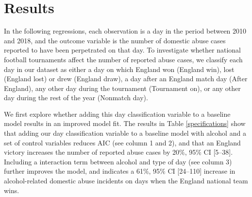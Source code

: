 \documentclass[12pt, letterpaper]{article}
\begin{document}
\clearpage


\section{Results}

In the following regressions, each observation is a day in the period between 2010 and 2018, and the outcome variable is the number of domestic abuse cases reported to have been perpetrated on that day. To investigate whether national football tournaments affect the number of reported abuse cases, we classify each day in our dataset as either a day on which England won (England win), lost (England lost) or drew (England draw), a day after an England match day (After England), any other day during the tournament (Tournament on), or any other day during the rest of the year (Nonmatch day). 

We first explore whether adding this day classification variable to a baseline model results in an improved model fit. The results in Table \ref{specifications} show that adding our day classification variable to a baseline model with alcohol and a set of control variables reduces AIC (see column 1 and 2), and that an England victory increases the number of reported abuse cases by 20\%, 95\% CI [5--38]. Including a interaction term between alcohol and type of day (see column 3) further improves the model, and indicates a 61\%, 95\% CI [24--110] increase in alcohol-related domestic abuse incidents on days when the England national team wins. 
\end{document}
